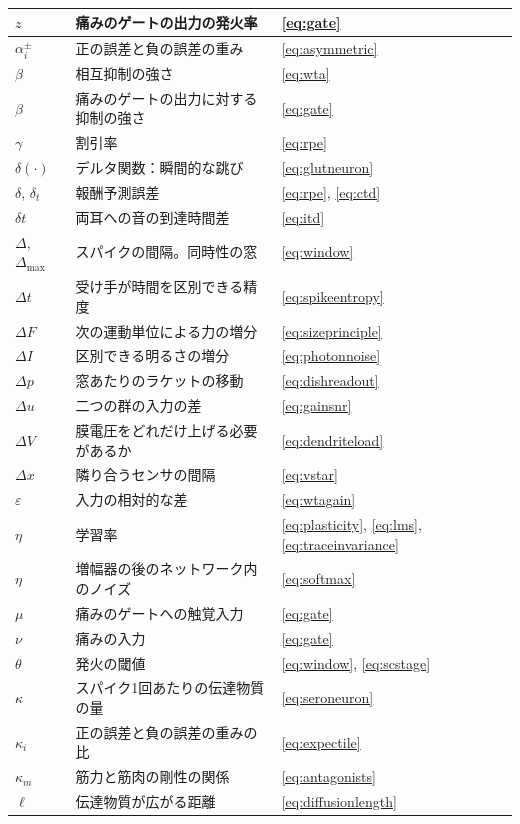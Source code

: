 \begin{center}
\begin{longtable}{>{\raggedright}p{2.0cm}>{\raggedright}p{9.6cm}>{\raggedright\arraybackslash}p{2.4cm}}
$z$ & 痛みのゲートの出力の発火率 & \eqref{eq:gate} \\
\midrule
$\alpha_i^\pm$ & 正の誤差と負の誤差の重み & \eqref{eq:asymmetric} \\
$\beta$ & 相互抑制の強さ & \eqref{eq:wta} \\
$\beta$ & 痛みのゲートの出力に対する抑制の強さ & \eqref{eq:gate} \\
$\gamma$ & 割引率 & \eqref{eq:rpe} \\
$\delta(\cdot)$ & デルタ関数：瞬間的な跳び & \eqref{eq:glutneuron} \\
$\delta$, $\delta_t$ & 報酬予測誤差 & \eqref{eq:rpe}, \eqref{eq:ctd} \\
$\delta t$ & 両耳への音の到達時間差 & \eqref{eq:itd} \\
$\Delta$, $\Delta_{\max}$ & スパイクの間隔。同時性の窓 & \eqref{eq:window} \\
$\Delta t$ & 受け手が時間を区別できる精度 & \eqref{eq:spikeentropy} \\
$\Delta F$ & 次の運動単位による力の増分 & \eqref{eq:sizeprinciple} \\
$\Delta I$ & 区別できる明るさの増分 & \eqref{eq:photonnoise} \\
$\Delta p$ & 窓あたりのラケットの移動 & \eqref{eq:dishreadout} \\
$\Delta u$ & 二つの群の入力の差 & \eqref{eq:gainsnr} \\
$\Delta V$ & 膜電圧をどれだけ上げる必要があるか & \eqref{eq:dendriteload} \\
$\Delta x$ & 隣り合うセンサの間隔 & \eqref{eq:vstar} \\
$\varepsilon$ & 入力の相対的な差 & \eqref{eq:wtagain} \\
$\eta$ & 学習率 & \eqref{eq:plasticity}, \eqref{eq:lms}, \eqref{eq:traceinvariance} \\
$\eta$ & 増幅器の後のネットワーク内のノイズ & \eqref{eq:softmax} \\
$\mu$ & 痛みのゲートへの触覚入力 & \eqref{eq:gate} \\
$\nu$ & 痛みの入力 & \eqref{eq:gate} \\
$\theta$ & 発火の閾値 & \eqref{eq:window}, \eqref{eq:scstage} \\
$\kappa$ & スパイク1回あたりの伝達物質の量 & \eqref{eq:seroneuron} \\
$\kappa_i$ & 正の誤差と負の誤差の重みの比 & \eqref{eq:expectile} \\
$\kappa_m$ & 筋力と筋肉の剛性の関係 & \eqref{eq:antagonists} \\
$\ell$ & 伝達物質が広がる距離 & \eqref{eq:diffusionlength} \\

\end{longtable}
\end{center}

